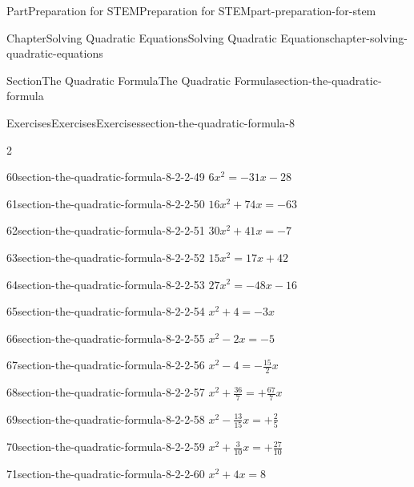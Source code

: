 \documentclass[twoside,10pt,]{book}
\numberwithin{equation}{section}
\begin{document}
\begin{partptx}{Part}{Preparation for STEM}{}{Preparation for STEM}{}{}{part-preparation-for-stem}
\begin{chapterptx}{Chapter}{Solving Quadratic Equations}{}{Solving Quadratic Equations}{}{}{chapter-solving-quadratic-equations}
\begin{sectionptx}{Section}{The Quadratic Formula}{}{The Quadratic Formula}{}{}{section-the-quadratic-formula}
\begin{exercises-subsection}{Exercises}{Exercises}{}{Exercises}{}{}{section-the-quadratic-formula-8}
\begin{exercisegroupcol}{2}
\begin{divisionexerciseegcol}{60}{}{}{section-the-quadratic-formula-8-2-2-49}%
\({6x^{2}}={-31x-28}\)%
\end{divisionexerciseegcol}%
\begin{divisionexerciseegcol}{61}{}{}{section-the-quadratic-formula-8-2-2-50}%
\({16x^{2}+74x}={-63}\)%
\end{divisionexerciseegcol}%
\begin{divisionexerciseegcol}{62}{}{}{section-the-quadratic-formula-8-2-2-51}%
\({30x^{2}+41x}={-7}\)%
\end{divisionexerciseegcol}%
\begin{divisionexerciseegcol}{63}{}{}{section-the-quadratic-formula-8-2-2-52}%
\({15x^{2}}={17x+42}\)%
\end{divisionexerciseegcol}%
\begin{divisionexerciseegcol}{64}{}{}{section-the-quadratic-formula-8-2-2-53}%
\({27x^{2}}={-48x-16}\)%
\end{divisionexerciseegcol}%
\begin{divisionexerciseegcol}{65}{}{}{section-the-quadratic-formula-8-2-2-54}%
\({x^{2}+4}={-3x}\)%
\end{divisionexerciseegcol}%
\begin{divisionexerciseegcol}{66}{}{}{section-the-quadratic-formula-8-2-2-55}%
\({x^{2}-2x}={-5}\)%
\end{divisionexerciseegcol}%
\begin{divisionexerciseegcol}{67}{}{}{section-the-quadratic-formula-8-2-2-56}%
\({x^{2}-4}={-{\frac{15}{2}}x}\)%
\end{divisionexerciseegcol}%
\begin{divisionexerciseegcol}{68}{}{}{section-the-quadratic-formula-8-2-2-57}%
\({x^{2}+{\frac{36}{7}}}={ + {\frac{67}{7}}x}\)%
\end{divisionexerciseegcol}%
\begin{divisionexerciseegcol}{69}{}{}{section-the-quadratic-formula-8-2-2-58}%
\({x^{2} - {\frac{13}{15}}x}={ + {\frac{2}{5}}}\)%
\end{divisionexerciseegcol}%
\begin{divisionexerciseegcol}{70}{}{}{section-the-quadratic-formula-8-2-2-59}%
\({x^{2}+{\frac{3}{10}}x}={ + {\frac{27}{10}}}\)%
\end{divisionexerciseegcol}%
\begin{divisionexerciseegcol}{71}{}{}{section-the-quadratic-formula-8-2-2-60}%
\({x^{2}+4x}={8}\)%
\end{divisionexerciseegcol}%

\end{exercisegroupcol}
\end{exercises-subsection}
\end{sectionptx}
\end{chapterptx}
\end{partptx}
\end{document}
